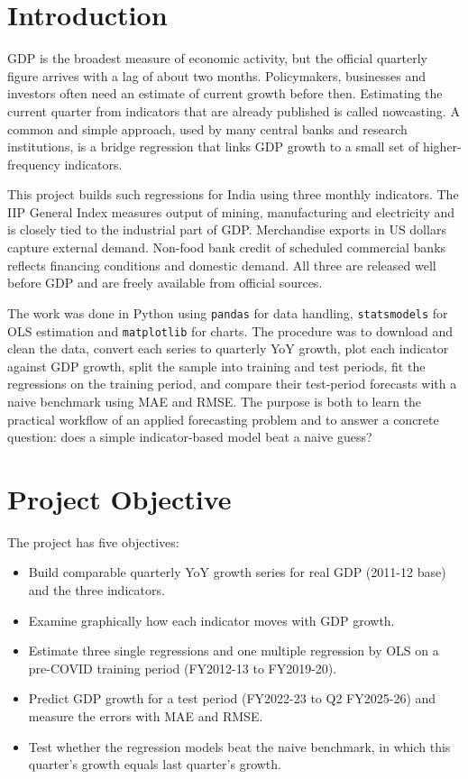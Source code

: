 \documentclass[11pt, a4paper]{article}
\begin{document}
\section{Introduction}
GDP is the broadest measure of economic activity, but the official quarterly figure arrives with a lag of about two months. Policymakers, businesses and investors often need an estimate of current growth before then. Estimating the current quarter from indicators that are already published is called nowcasting. A common and simple approach, used by many central banks and research institutions, is a bridge regression that links GDP growth to a small set of higher-frequency indicators.

This project builds such regressions for India using three monthly indicators. The IIP General Index measures output of mining, manufacturing and electricity and is closely tied to the industrial part of GDP. Merchandise exports in US dollars capture external demand. Non-food bank credit of scheduled commercial banks reflects financing conditions and domestic demand. All three are released well before GDP and are freely available from official sources.

The work was done in Python using \texttt{pandas} for data handling, \texttt{statsmodels} for OLS estimation and \texttt{matplotlib} for charts. The procedure was to download and clean the data, convert each series to quarterly YoY growth, plot each indicator against GDP growth, split the sample into training and test periods, fit the regressions on the training period, and compare their test-period forecasts with a naive benchmark using MAE and RMSE. The purpose is both to learn the practical workflow of an applied forecasting problem and to answer a concrete question: does a simple indicator-based model beat a naive guess?


\section{Project Objective}
The project has five objectives:
\begin{itemize}
    \item Build comparable quarterly YoY growth series for real GDP (2011-12 base) and the three indicators.
    \item Examine graphically how each indicator moves with GDP growth.
    \item Estimate three single regressions and one multiple regression by OLS on a pre-COVID training period (FY2012-13 to FY2019-20).
    \item Predict GDP growth for a test period (FY2022-23 to Q2 FY2025-26) and measure the errors with MAE and RMSE.
    \item Test whether the regression models beat the naive benchmark, in which this quarter's growth equals last quarter's growth.
\end{itemize}
\end{document}
